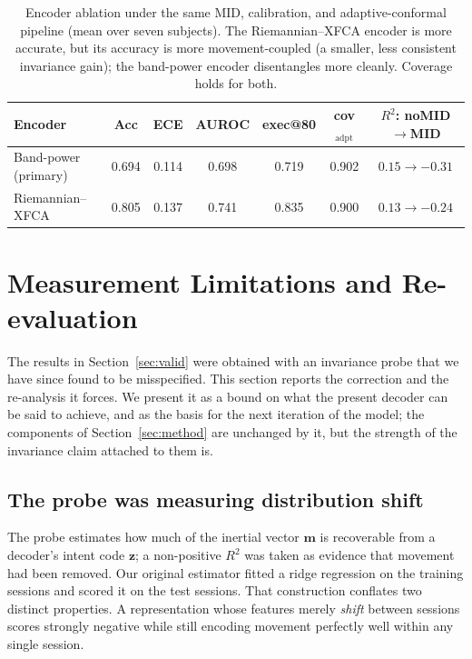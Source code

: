 \documentclass[journal]{IEEEtran}
\begin{document}
\begin{table}[t]
\caption{Encoder ablation under the same MID, calibration, and adaptive-conformal
pipeline (mean over seven subjects). The Riemannian--XFCA encoder is more accurate,
but its accuracy is more movement-coupled (a smaller, less consistent invariance
gain); the band-power encoder disentangles more cleanly. Coverage holds for both.}
\label{tab:enc}
\centering
\begin{tabular}{lcccccc}
\toprule
Encoder & Acc & ECE & AUROC & exec@80 & cov$_{\text{adpt}}$ & $R^2$: noMID$\rightarrow$MID \\
\midrule
Band-power (primary) & 0.694 & 0.114 & 0.698 & 0.719 & 0.902 & $0.15\rightarrow-0.31$ \\
Riemannian--XFCA & 0.805 & 0.137 & 0.741 & 0.835 & 0.900 & $0.13\rightarrow-0.24$ \\
\bottomrule
\end{tabular}
\end{table}


\section{Measurement Limitations and Re-evaluation}\label{sec:reeval}

The results in Section~\ref{sec:valid} were obtained with an invariance probe that we
have since found to be misspecified. This section reports the correction and the
re-analysis it forces. We present it as a bound on what the present decoder can be said
to achieve, and as the basis for the next iteration of the model; the components of
Section~\ref{sec:method} are unchanged by it, but the strength of the invariance claim
attached to them is.

\subsection{The probe was measuring distribution shift}\label{sec:probe}

The probe estimates how much of the inertial vector $\mathbf{m}$ is recoverable from a
decoder's intent code $\mathbf{z}$; a non-positive $R^2$ was taken as evidence that
movement had been removed. Our original estimator fitted a ridge regression on the
training sessions and scored it on the test sessions. That construction conflates two
distinct properties. A representation whose features merely \emph{shift} between
sessions scores strongly negative while still encoding movement perfectly well within
any single session.
\end{document}
